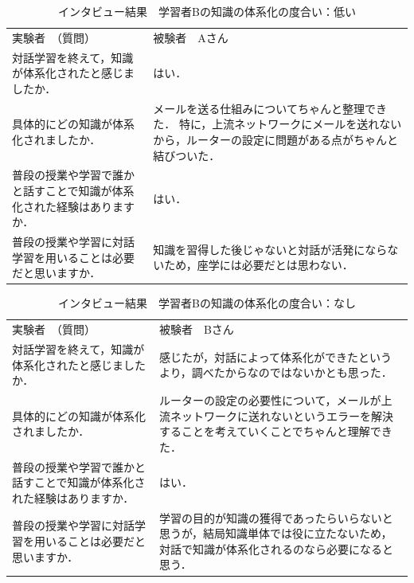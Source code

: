 \documentclass[12pt,a4j,titlepage]{ltjsarticle}
\begin{document}
\begin{table}[htbp]
\begin{center}
\caption{インタビュー結果　学習者Bの知識の体系化の度合い：低い}
\begin{tabular}{|p{8cm}|p{8cm}|}
\cline{1-2}
実験者　（質問）  & 被験者　Aさん   \\ \cline{1-2}
対話学習を終えて，知識が体系化されたと感じましたか．   & はい．       \\ \cline{1-2}
具体的にどの知識が体系化されましたか．                 & メールを送る仕組みについてちゃんと整理できた． 特に，上流ネットワークにメールを送れないから，ルーターの設定に問題がある点がちゃんと結びついた．   \\ \cline{1-2}
普段の授業や学習で誰かと話すことで知識が体系化された経験はありますか． & はい．         \\ \cline{1-2}
普段の授業や学習に対話学習を用いることは必要だと思いますか．      & 知識を習得した後じゃないと対話が活発にならないため，座学には必要だとは思わない．      \\ \cline{1-2}
\end{tabular}
\end{center}
\label{tb:interview}
\end{table}

\clearpage

\begin{table}[htbp]
\begin{center}
\caption{インタビュー結果　学習者Bの知識の体系化の度合い：なし}
\begin{tabular}{|p{8cm}|p{8cm}|}
\cline{1-2}
実験者　（質問）  & 被験者　Bさん   \\ \cline{1-2}
対話学習を終えて，知識が体系化されたと感じましたか．   & 感じたが，対話によって体系化ができたというより，調べたからなのではないかとも思った．       \\ \cline{1-2}
具体的にどの知識が体系化されましたか．                 & ルーターの設定の必要性について，メールが上流ネットワークに送れないというエラーを解決することを考えていくことでちゃんと理解できた．   \\ \cline{1-2}
普段の授業や学習で誰かと話すことで知識が体系化された経験はありますか． & はい．         \\ \cline{1-2}
普段の授業や学習に対話学習を用いることは必要だと思いますか．      & 学習の目的が知識の獲得であったらいらないと思うが，結局知識単体では役に立たないため，対話で知識が体系化されるのなら必要になると思う．      \\ \cline{1-2}
\end{tabular}
\end{center}
\label{tb:interview}
\end{table}
\end{document}
